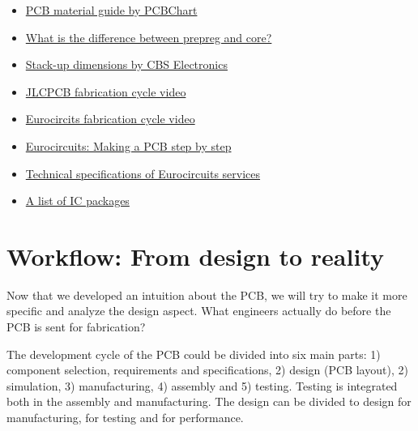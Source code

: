\documentclass[final]{cubedoc}
\begin{document}
	\begin{itemize}
		\item \href{https://web.archive.org/web/20200814084633/https://www.pcbcart.com/pcb-capability/pcb-materials.html}{PCB material guide by PCBChart}
		\item \href{https://web.archive.org/web/20200814084719/https://electronics.stackexchange.com/questions/356063/what-exactly-is-prepreg-and-core-in-a-pcb}{What is the difference between prepreg and core?}
		\item \href{https://web.archive.org/web/20200814084757/https://www.cbspcb.com/pcboard-stackups/}{Stack-up dimensions by CBS Electronics} 
		\item \href{https://www.youtube.com/watch?v=ljOoGyCso8s&t=311s}{JLCPCB fabrication cycle video}
		\item \href{https://www.youtube.com/watch?v=sIV0icM_Ujo&t=436s}{Eurocircits fabrication cycle video}
		\item \href{https://web.archive.org/web/20200814085226/https://www.eurocircuits.com/making-a-pcb-pcb-manufacture-step-by-step/}{Eurocircuits: Making a PCB step by step}
		\item \href{https://web.archive.org/web/20200814085350/https://www.eurocircuits.com/technical-specifications-of-all-eurocircuits-prototype-small-volume-services-european-origin/}{Technical specifications of Eurocircuits services}    
		\item \href{https://web.archive.org/web/20200814085429/https://en.wikipedia.org/wiki/List_of_integrated_circuit_packaging_types}{A list of IC packages}
	\end{itemize}
	
	\section{Workflow: From design to reality} 
	
	Now that we developed an intuition about the PCB, we will try to make it more specific and analyze the design aspect. What engineers actually do before the PCB is sent for fabrication?
	
	The development cycle of the PCB could be divided into six main parts: 1) component selection, requirements and specifications, 2) design (PCB layout), 2) simulation, 3) manufacturing, 4) assembly and 5) testing. Testing is integrated both in the assembly and manufacturing.
	The design can be divided to design for manufacturing, for testing and for performance.  
	
\end{document}
